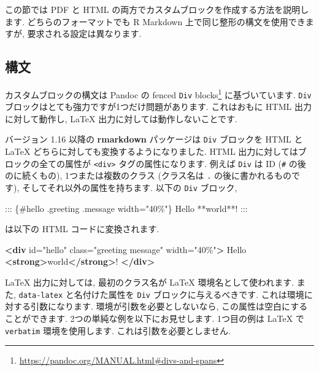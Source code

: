 \documentclass[
  11pt,
]{bxjsreport}
\newenvironment{Shaded}{\begin{snugshade}}{\end{snugshade}}
\newcommand{\KeywordTok}[1]{\textcolor[rgb]{0.13,0.29,0.53}{\textbf{#1}}}
\newcommand{\NormalTok}[1]{#1}
\newcommand{\OtherTok}[1]{\textcolor[rgb]{0.56,0.35,0.01}{#1}}
\newcommand{\StringTok}[1]{\textcolor[rgb]{0.31,0.60,0.02}{#1}}
\renewcommand{\href}[2]{#2\footnote{\url{#1}}}
\begin{document}
この節では PDF と HTML の両方でカスタムブロックを作成する方法を説明します. どちらのフォーマットでも R Markdown 上で同じ整形の構文を使用できますが, 要求される設定は異なります.

\hypertarget{block-syntax}{%
\subsection{構文}\label{block-syntax}}

カスタムブロックの構文は Pandoc の \href{https://pandoc.org/MANUAL.html\#divs-and-spans}{fenced \texttt{Div} blocks} に基づいています. \texttt{Div} ブロックはとても強力ですが1つだけ問題があります. これはおもに HTML 出力に対して動作し, LaTeX 出力に対しては動作しないことです.

バージョン 1.16 以降の \textbf{rmarkdown} パッケージは \texttt{Div} ブロックを HTML と LaTeX どちらに対しても変換するようになりました. HTML 出力に対してはブロックの全ての属性が \texttt{\textless{}div\textgreater{}} タグの属性になります. 例えば \texttt{Div} は ID (\texttt{\#} の後のに続くもの), 1つまたは複数のクラス (クラス名は \texttt{.} の後に書かれるものです), そしてそれ以外の属性を持ちます. 以下の \texttt{Div} ブロック,

\begin{Shaded}
\begin{Highlighting}[]
\NormalTok{::: \{\#hello .greeting .message width="40\%"\}}
\NormalTok{Hello **world**!}
\NormalTok{:::}
\end{Highlighting}
\end{Shaded}

は以下の HTML コードに変換されます.

\begin{Shaded}
\begin{Highlighting}[]
\KeywordTok{\textless{}div}\OtherTok{ id=}\StringTok{"hello"}\OtherTok{ class=}\StringTok{"greeting message"}\OtherTok{ width=}\StringTok{"40\%"}\KeywordTok{\textgreater{}}
\NormalTok{  Hello }\KeywordTok{\textless{}strong\textgreater{}}\NormalTok{world}\KeywordTok{\textless{}/strong\textgreater{}}\NormalTok{!}
\KeywordTok{\textless{}/div\textgreater{}}
\end{Highlighting}
\end{Shaded}

LaTeX 出力に対しては, 最初のクラス名が LaTeX 環境名として使われます. また, \texttt{data-latex} と名付けた属性を \texttt{Div} ブロックに与えるべきです. これは環境に対する引数になります. 環境が引数を必要としないなら, この属性は空白にすることができます. 2つの単純な例を以下にお見せします. 1つ目の例は LaTeX で \texttt{verbatim} 環境を使用します. これは引数を必要としません.
\end{document}
